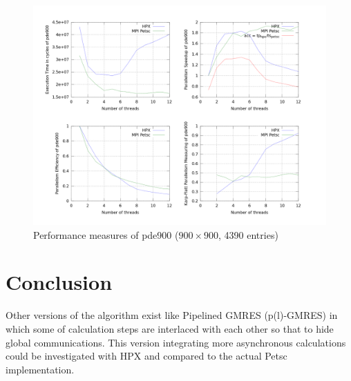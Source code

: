 \documentclass{llncs}
\begin{document}
\begin{figure}[h!]
\begin{center}
\includegraphics[scale=0.25]{Images/pde900.png}
\end{center}
\caption{Performance measures of pde900 ($900\times900$, 4390 entries)}
\label{pde900}
\end{figure}


\section{Conclusion}
Other versions of the algorithm exist like Pipelined GMRES (p(l)-GMRES) \cite{Parall_GMRES} in which some of calculation steps are interlaced with each other so that to hide global communications. This version integrating more asynchronous calculations could be investigated with HPX and compared to the actual Petsc implementation.



\end{document}
